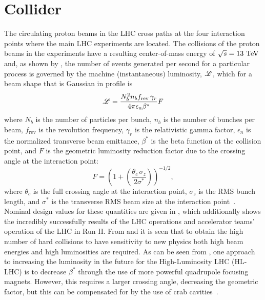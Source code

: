 \section{Collider}

The circulating proton beams in the LHC cross paths at the four interaction points where the main LHC experiments are located.
The collisions of the proton beams in the experiments have a resulting center-of-mass energy of $\sqrt{s} = 13~\mathrm{TeV}$ and, as shown by , the number of events generated per second for a particular process is governed by the machine (instantaneous) luminosity, $\mathscr{L}$, which for a beam shape that is Gaussian in profile is
\begin{equation}
 \mathscr{L} = \frac{N_{b}^{2} n_{b} f_{\mathrm{rev}} \,\gamma_{r}}{4 \pi \epsilon_{n} \beta^{*}} F
 \label{eq:machine_luminosity}
\end{equation}
where $N_{b}$ is the number of particles per bunch, $n_{b}$ is the number of bunches per beam, $f_{\mathrm{rev}}$ is the revolution frequency, $\gamma_{r}$ is the relativistic gamma factor, $\epsilon_{n}$ is the normalized transverse beam emittance, $\beta^{*}$ is the beta function at the collision point, and $F$ is the geometric luminosity reduction factor due to the crossing angle at the interaction point:
\[
 F = \left(1 + \left(\frac{\theta_{c} \,\sigma_{z}}{2 \sigma^{*}}\right)\right)^{-1/2},
\]
where $\theta_{c}$ is the full crossing angle at the interaction point, $\sigma_{z}$ is the RMS bunch length, and $\sigma^{*}$ is the transverse RMS beam size at the interaction point~\cite{Evans:2008}.
Nominal design values for these quantities are given in , which additionally shows the incredibly successfully results of the LHC operations and accelerator teams' operation of the LHC in Run II.
From  and  it is seen that to obtain the high number of hard collisions to have sensitivity to new physics both high beam energies and high luminosities are required.
As can be seen from , one approach to increasing the luminosity in the future for the High-Luminosity LHC (HL-LHC) is to decrease $\beta^{*}$ through the use of more powerful quadrupole focusing magnets.
However, this requires a larger crossing angle, decreasing the geometric factor, but this can be compensated for by the use of crab cavities~\cite{PhysRevAccelBeams.19.101003}.

